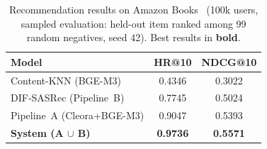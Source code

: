 \begin{table}[H]
\caption{Recommendation results on Amazon Books~\cite{hou2024amazon} (100k users, sampled
         evaluation: held-out item ranked among 99 random negatives,
         seed 42).
         Best results in \textbf{bold}.}
\label{tab:main_results}
\centering
\begin{tabular}{lcc}
\toprule
\textbf{Model} & \textbf{HR@10} & \textbf{NDCG@10} \\
\midrule
Content-KNN (BGE-M3)            & 0.4346 & 0.3022 \\
DIF-SASRec (Pipeline~B)         & 0.7745 & 0.5024 \\
Pipeline~A (Cleora+BGE-M3)      & 0.9047 & 0.5393 \\
\midrule
\textbf{System (A $\cup$ B)}    & \textbf{0.9736} & \textbf{0.5571} \\
\bottomrule
\end{tabular}
\end{table}
